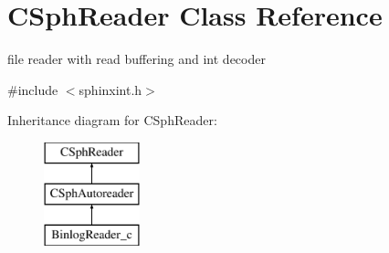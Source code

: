 \hypertarget{classCSphReader}{\section{C\-Sph\-Reader Class Reference}
\label{classCSphReader}
}


file reader with read buffering and int decoder  




{\ttfamily \#include $<$sphinxint.\-h$>$}

Inheritance diagram for C\-Sph\-Reader\-:\begin{figure}[H]
\begin{center}
\leavevmode
\includegraphics[height=3.000000cm]{classCSphReader}
\end{center}
\end{figure}
